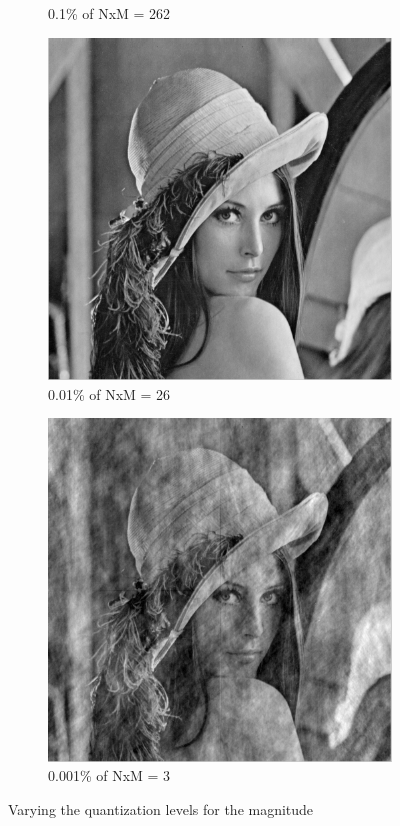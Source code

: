 \documentclass[a4paper, 10pt, conference] {article}
\begin{document}
\begin{figure}[H]
\begin{subfigure}{0.24\textwidth}
  		\caption{0.1\% of NxM = 262}
  	\end{subfigure}
  	\begin{subfigure}{0.24\textwidth}
  		\centering
  		\includegraphics[scale=0.3]{reportImages/exp3_phase00001.PNG}
  		\caption{0.01\% of NxM = 26}
  	\end{subfigure}
  	\begin{subfigure}{0.24\textwidth}
  		\centering
  		\includegraphics[scale=0.3]{reportImages/exp3_phase000001.PNG}
  		\caption{0.001\% of NxM = 3}
  	\end{subfigure}
  	
  	\caption{Varying the quantization levels for the magnitude}
  	\label{exp3_phase_1}
  \end{figure}
\end{document}
